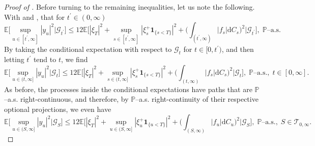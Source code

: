 \documentclass[10pt]{article} %
\newcommand\cG{\mathcal G}
\newcommand\cT{\mathcal T}
\def \E{\mathbb{E}}
\def \P{\mathbb{P}}
\newcommand{\1}{\mathbf{1}}
\def\d{\mathrm{d}}
\begin{document}
\begin{proof}[Proof of ]
\medskip
Before turning to the remaining inequalities, let us note the following. With  and , that for $t^\prime \in (0,\infty)$
\begin{equation*}
	\E\bigg[\sup_{u \in [t^\prime,\infty]}|y_u|^2 \bigg| \cG_{t^\prime}\bigg] \leq 12 \E\bigg[|\xi_T|^2 + \sup_{s \in [t^\prime,\infty]}|\xi^+_s\mathbf{1}_{\{s<T\}}|^2 + \bigg(\int_{(t^\prime,\infty)} |f_s| \d C_s\bigg)^2 \bigg| \cG_{t^\prime} \bigg], \; \text{$\P$--a.s.}
\end{equation*}
By taking the conditional expectation with respect to $\cG_t$ for $t \in [0,t^\prime)$, and then letting $t^\prime$ tend to $t$, we find
\begin{equation}\label{eq::conditional_sup_y1}
	\E\bigg[\sup_{u \in (t,\infty]}|y_u|^2 \bigg| \cG_t\bigg] \leq 12 \E\bigg[|\xi_T|^2 + \sup_{s \in (t,\infty]}|\xi^+_s\mathbf{1}_{\{s<T\}}|^2 + \bigg(\int_{(t,\infty)} |f_s| \d C_s\bigg)^2 \bigg| \cG_t \bigg], \; \text{$\P$--a.s.}, \; t \in [0,\infty].
\end{equation}
As before, the processes inside the conditional expectations have paths that are $\P$--a.s. right-continuous, and therefore, by $\P$--a.s. right-continuity of their respective optional projections, we even have
\begin{equation}\label{eq::ineq_sup_y_cond}
	\E\bigg[\sup_{u \in (S,\infty]}|y_u|^2 \bigg| \cG_S\bigg] \leq 12 \E\bigg[|\xi_T|^2 + \sup_{u \in (S,\infty]}|\xi^+_u\mathbf{1}_{\{u<T\}}|^2 + \bigg(\int_{(S,\infty)} |f_u| \d C_u\bigg)^2 \bigg| \cG_S \bigg], \; \text{$\P$--a.s.}, \; S \in \cT_{0,\infty}.
\end{equation}


\end{proof}
\end{document}
